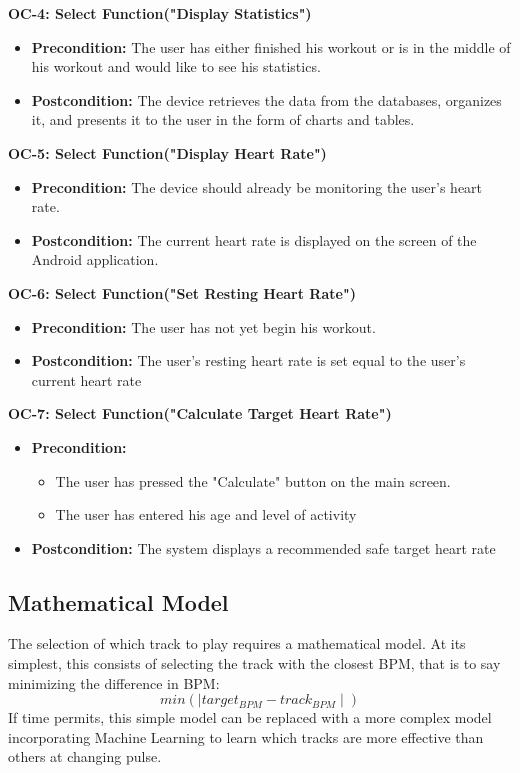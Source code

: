 \documentclass[letterpaper,english, 12pt]{scrreprt}
\begin{document}
{\bf OC-4: Select Function("Display Statistics")}
\begin{itemize}
        \item {\bf Precondition: } The user has either finished his workout or is in the middle of his workout and would like to see his statistics.
        \item {\bf Postcondition: } The device retrieves the data from the databases, organizes it, and presents it to the user in the form of charts and tables.
\end{itemize}

{\bf OC-5: Select Function("Display Heart Rate")}
\begin{itemize}
        \item {\bf Precondition: } The device should already be monitoring the user's heart rate.
        \item {\bf Postcondition: } The current heart rate is displayed on the screen of the Android application.
\end{itemize}

{\bf OC-6: Select Function("Set Resting Heart Rate")}
\begin{itemize}
	\item{\bf Precondition: } The user has not yet begin his workout.
	\item{\bf Postcondition: } The user's resting heart rate is set equal to the user's current heart rate
\end{itemize}

{\bf OC-7: Select Function("Calculate Target Heart Rate")}
\begin{itemize}
	\item{\bf Precondition: } 
		\begin{itemize}
			\item The user has pressed the "Calculate" button on the main screen.
			\item The user has entered his age and level of activity
		\end{itemize}
	\item{\bf Postcondition: } The system displays a recommended safe target heart rate
\end{itemize}
	

\subsection{Mathematical Model}
The selection of which track to play requires a mathematical model. At its simplest, this consists of selecting the track with the closest BPM, that is to say minimizing the difference in BPM:
\begin{equation}
  min(\mid target_{BPM} - track_{BPM} \mid)
\end{equation}
If time permits, this simple model can be replaced with a more complex model incorporating Machine Learning to learn which tracks are more effective than others at changing pulse.
\end{document}
